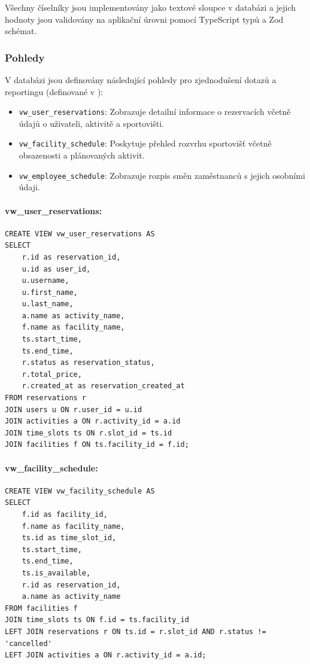 \documentclass[12pt, a4paper]{article}
\begin{document}
Všechny číselníky jsou implementovány jako textové sloupce v databázi a jejich hodnoty jsou validovány na aplikační úrovni pomocí TypeScript typů a Zod schémat.

\subsubsection{Pohledy}
\label{subsubsec:pohledy}

V databázi jsou definovány následující pohledy pro zjednodušení dotazů a reportingu (definované v ):

\begin{itemize}
    \item \texttt{vw\_user\_reservations}: Zobrazuje detailní informace o rezervacích včetně údajů o uživateli, aktivitě a sportovišti.
    \item \texttt{vw\_facility\_schedule}: Poskytuje přehled rozvrhu sportovišť včetně obsazenosti a plánovaných aktivit.
    \item \texttt{vw\_employee\_schedule}: Zobrazuje rozpis směn zaměstnanců s jejich osobními údaji.
\end{itemize}

\paragraph{vw\_user\_reservations:}
\begin{lstlisting}
CREATE VIEW vw_user_reservations AS
SELECT
    r.id as reservation_id,
    u.id as user_id,
    u.username,
    u.first_name,
    u.last_name,
    a.name as activity_name,
    f.name as facility_name,
    ts.start_time,
    ts.end_time,
    r.status as reservation_status,
    r.total_price,
    r.created_at as reservation_created_at
FROM reservations r
JOIN users u ON r.user_id = u.id
JOIN activities a ON r.activity_id = a.id
JOIN time_slots ts ON r.slot_id = ts.id
JOIN facilities f ON ts.facility_id = f.id;
\end{lstlisting}

\paragraph{vw\_facility\_schedule:}
\begin{lstlisting}
CREATE VIEW vw_facility_schedule AS
SELECT
    f.id as facility_id,
    f.name as facility_name,
    ts.id as time_slot_id,
    ts.start_time,
    ts.end_time,
    ts.is_available,
    r.id as reservation_id,
    a.name as activity_name
FROM facilities f
JOIN time_slots ts ON f.id = ts.facility_id
LEFT JOIN reservations r ON ts.id = r.slot_id AND r.status != 'cancelled'
LEFT JOIN activities a ON r.activity_id = a.id;
\end{lstlisting}
\end{document}
